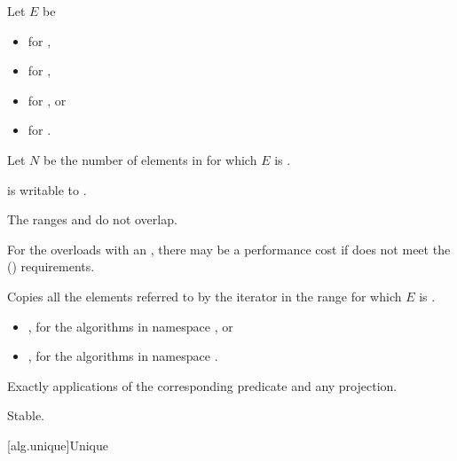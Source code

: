 \begin{itemdescr}
\pnum
Let $E$ be
\begin{itemize}
\item {} for ,
\item {} for ,
\item {} for , or
\item {} for .
\end{itemize}

\pnum
Let $N$ be the number of elements in 
for which $E$ is .

\pnum
\mandates
{} is writable to .

\pnum
\expects
The ranges  and 
do not overlap.
\begin{note}
For the overloads with an ,
there may be a performance cost
if  does not meet
the  () requirements.
\end{note}

\pnum
\effects
Copies all the elements referred to by the iterator 
in the range  for which $E$ is .

\pnum
\returns
\begin{itemize}
\item {}, for the algorithms in namespace , or
\item {}, for the algorithms in namespace .
\end{itemize}

\pnum
\complexity
Exactly  applications
of the corresponding predicate and any projection.

\pnum
\remarks
Stable.
\end{itemdescr}

[alg.unique]{Unique}

